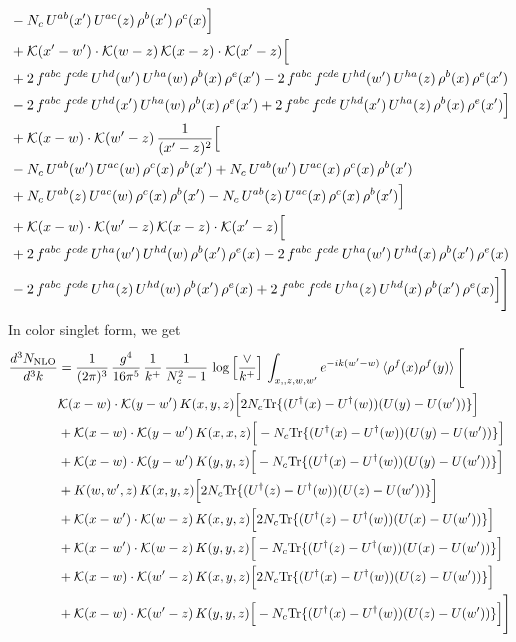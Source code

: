 \documentclass[10pt]{article}
\numberwithin{equation}{section}
\begin{document}
\begin{align}
& -N_{c}\,U^{ab}(x')\,U^{ac}(z)\,\rho^{b}(x')\,\rho^{c}(x)\Big]\notag\\
& +\mathcal{K}(x'-w')\cdot\mathcal{K}(w-z)\,\mathcal{K}(x-z)\cdot\mathcal{K}(x'-z)\Big[\notag\\
& +2\,f^{abc}\,f^{cde}\,U^{hd}(w')\,U^{ha}(w)\,\rho^{b}(x)\,\rho^{e}(x') -2\,f^{abc}\,f^{cde}\,U^{hd}(w')\,U^{ha}(z)\,\rho^{b}(x)\,\rho^{e}(x')\notag\\
& -2\,f^{abc}\,f^{cde}\,U^{hd}(x')\,U^{ha}(w)\,\rho^{b}(x)\,\rho^{e}(x') +2\,f^{abc}\,f^{cde}\,U^{hd}(x')\,U^{ha}(z)\,\rho^{b}(x)\,\rho^{e}(x')\Big]\notag\\
& +\mathcal{K}(x-w)\cdot\mathcal{K}(w'-z)\,\frac{1}{(x'-z)^{2}}\Big[\notag\\
& -N_{c}\,U^{ab}(w')\,U^{ac}(w)\,\rho^{c}(x)\,\rho^{b}(x') +N_{c}\,U^{ab}(w')\,U^{ac}(x)\,\rho^{c}(x)\,\rho^{b}(x')\notag\\
& +N_{c}\,U^{ab}(z)\,U^{ac}(w)\,\rho^{c}(x)\,\rho^{b}(x') -N_{c}\,U^{ab}(z)\,U^{ac}(x)\,\rho^{c}(x)\,\rho^{b}(x')\Big]\notag\\
& +\mathcal{K}(x-w)\cdot\mathcal{K}(w'-z)\,\mathcal{K}(x-z)\cdot\mathcal{K}(x'-z)\Big[\notag\\
& +2\,f^{abc}\,f^{cde}\,U^{ha}(w')\,U^{hd}(w)\,\rho^{b}(x')\,\rho^{e}(x) -2\,f^{abc}\,f^{cde}\,U^{ha}(w')\,U^{hd}(x)\,\rho^{b}(x')\,\rho^{e}(x)\notag\\
& -2\,f^{abc}\,f^{cde}\,U^{ha}(z)\,U^{hd}(w)\,\rho^{b}(x')\,\rho^{e}(x) +2\,f^{abc}\,f^{cde}\,U^{ha}(z)\,U^{hd}(x)\,\rho^{b}(x')\,\rho^{e}(x)\Big]\Bigg]
\end{align}
In color singlet form, we get
\begin{align}
\frac{d^{3}N_{\mathrm{NLO}}}{d^{3}k} & = \frac{1}{(2\pi)^{3}}\,\frac{g^{4}}{16\pi^{5}}\,\frac{1}{k^{+}}\,\frac{1}{N^{2}_{c}-1}\,\log\Big[\frac{\vee}{k^{+}}\Big]\,\int_{x,,z,w,w'}e^{-ik(w'-w)}\,\langle\rho^{f}(x)\rho^{f}(y) \rangle\,\Bigg[ \notag\\ & \mathcal K(x-w)\cdot\mathcal K(y-w')\,K(x,y,z)\Big[2 N_{c}{\rm Tr}\{(U^\dagger(x)-U^\dagger(w))(U(y)-U(w'))\}\Big]\notag\\
&+\mathcal K(x-w)\cdot\mathcal K(y-w')\,K(x,x,z)\Big[-N_{c}{\rm Tr}\{(U^\dagger(x)-U^\dagger(w))(U(y)-U(w'))\}\Big]\notag\\
&+\mathcal K(x-w)\cdot\mathcal K(y-w')\,K(y,y,z)\Big[-N_{c}{\rm Tr}\{(U^\dagger(x)-U^\dagger(w))(U(y)-U(w'))\}\Big]\notag\\
&+K(w,w',z)\,K(x,y,z)\Big[2 N_{c}{\rm Tr}\{(U^\dagger(z)-U^\dagger(w))(U(z)-U(w'))\}\Big]\notag\\
&+\mathcal K(x-w')\cdot\mathcal K(w-z)\,K(x,y,z)\Big[2 N_{c}{\rm Tr}\{(U^\dagger(z)-U^\dagger(w))(U(x)-U(w'))\}\Big]\notag\\
&+\mathcal K(x-w')\cdot\mathcal K(w-z)\,K(y,y,z)\Big[-N_{c}{\rm Tr}\{(U^\dagger(z)-U^\dagger(w))(U(x)-U(w'))\}\Big]\notag\\
&+\mathcal K(x-w)\cdot\mathcal K(w'-z)\,K(x,y,z)\Big[2 N_{c}{\rm Tr}\{(U^\dagger(x)-U^\dagger(w))(U(z)-U(w'))\}\Big]\notag\\
&+\mathcal K(x-w)\cdot\mathcal K(w'-z)\,K(y,y,z)\Big[-N_{c}{\rm Tr}\{(U^\dagger(x)-U^\dagger(w))(U(z)-U(w'))\}\Big]\Bigg]
\end{align}
\end{document}
